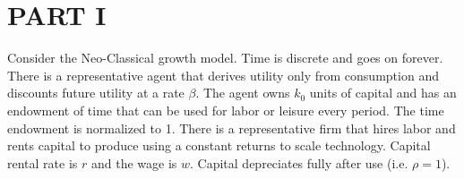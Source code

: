 \documentclass[a4paper]{article}
\begin{document}



\section{PART I}

Consider the Neo-Classical growth model. Time is discrete and goes on forever. There is a representative agent that derives utility only from consumption and discounts future utility at a rate $\beta$. The agent owns $k_0$ units of capital and has an endowment of time that can be used for labor or leisure every period. The time endowment is normalized to 1. There is a representative firm that hires labor and rents capital to produce using a constant returns to scale technology. Capital rental rate is $r$ and the wage is $w$. Capital depreciates fully after use (i.e. $\rho = 1$).
\end{document}
